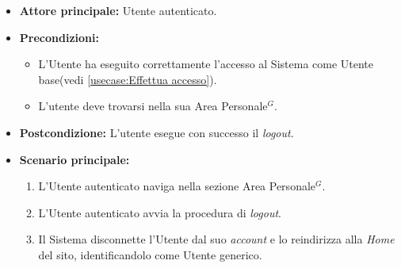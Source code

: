 \label{usecase:Effettua Logout}
\begin{itemize}
	\item \textbf{Attore principale:} Utente autenticato.

	\item \textbf{Precondizioni:}
	\begin{itemize}
        \item L'Utente ha eseguito correttamente l'accesso al Sistema come Utente base(vedi \autoref{usecase:Effettua accesso}).
        \item L'utente deve trovarsi nella sua Area Personale$^G$.
    \end{itemize}

	\item \textbf{Postcondizione:} L'utente esegue con successo il \textit{logout}.

	\item \textbf{Scenario principale:}
	      \begin{enumerate}
		      \item L'Utente autenticato naviga nella sezione Area Personale$^G$.
		      \item L'Utente autenticato avvia la procedura di \textit{logout}.
              \item Il Sistema disconnette l'Utente dal suo \textit{account} e lo reindirizza alla \textit{Home} del sito, identificandolo come Utente generico.
	      \end{enumerate}
\end{itemize}
